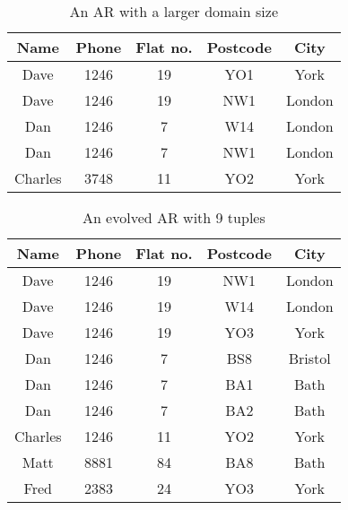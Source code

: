 {\line
\begin{table}[ht]
\begin{center}
\begin{tabular}{|c|c|c|c|c|} \hline 
{ \bf Name} & { \bf Phone} & {\bf Flat no. }  & { \bf Postcode}  & {\bf City} \\ \hline
Dave & 1246 & 19 & YO1 & York  \\
Dave & 1246 & 19 & NW1 & London \\
Dan & 1246 & 7 & W14 & London \\
Dan & 1246 & 7 & NW1 & London \\
Charles & 3748 & 11 & YO2 & York \\ \hline
\end{tabular}
\end{center}
\caption{\label{table:5.33} An AR with a larger domain size }
\end{table}
}

{\line
\begin{table}
\begin{center}
\begin{tabular}{|c|c|c|c|c|} \hline 
{ \bf Name} & { \bf Phone} & {\bf Flat no. }  & { \bf Postcode}  & {\bf City} \\ \hline
Dave & 1246 & 19 & NW1 & London  \\
Dave & 1246 & 19 & W14 & London \\
Dave & 1246 & 19 & YO3 & York \\
Dan & 1246 & 7 & BS8 & Bristol \\
Dan & 1246 & 7 & BA1 & Bath \\
Dan & 1246 & 7 & BA2 & Bath \\
Charles & 1246 & 11 & YO2 & York \\
Matt & 8881 & 84 & BA8 & Bath \\
Fred & 2383 & 24 & YO3 & York \\ \hline
\end{tabular}
\end{center}
\caption{\label{table:5.34} An evolved AR with 9 tuples }
\end{table}
}

\medskip

